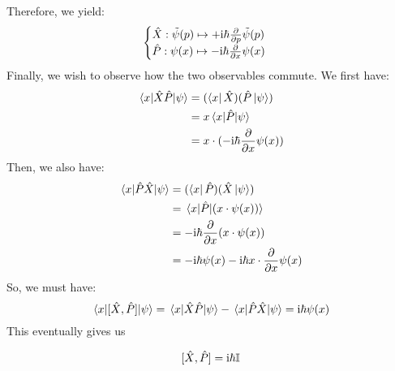 Therefore, we yield:
$$\begin{cases}
    \hat{X}: \tilde{\psi}(p) \mapsto +\mathrm{i} \hbar \pdv{p}\tilde{\psi}(p) \\
    \hat{P}: \psi(x) \mapsto -\mathrm{i} \hbar \pdv{x}\psi(x)
\end{cases}$$
Finally, we wish to observe how the two observables commute. We first have:
\begin{align*}
    \mel{x}{\hat{X}\hat{P}}{\psi} &= (\bra{x} \hat{X})(\hat{P} \ket{\psi}) \\
    &= x\mel{x}{\hat{P}}{\psi} \\
    &= x \cdot (-\mathrm{i} \hbar \pdv{x} \psi(x))
\end{align*}
Then, we also have:
\begin{align*}
    \mel{x}{\hat{P}\hat{X}}{\psi} &= (\bra{x} \hat{P})(\hat{X} \ket{\psi}) \\
    &= \mel{x}{\hat{P}}{(x \cdot \psi(x))} \\
    &= -\mathrm{i} \hbar \pdv{x} (x \cdot \psi(x)) \\
    &= -\mathrm{i} \hbar \psi(x) - \mathrm{i} \hbar x \cdot \pdv{x}\psi(x)
\end{align*}
So, we must have:
$$\mel{x}{[\hat{X}, \hat{P}]}{\psi} = \mel{x}{\hat{X}\hat{P}}{\psi} - \mel{x}{\hat{P}\hat{X}}{\psi} = \mathrm{i} \hbar \psi(x)$$
This eventually gives us
\begin{theorem}
    $$[\hat{X}, \hat{P}] = \mathrm{i} \hbar \mathbb{I}$$
\end{theorem}

